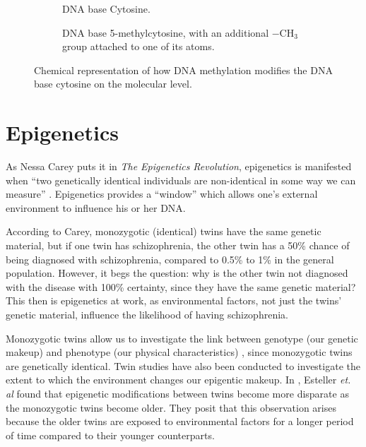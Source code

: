 \documentclass[12pt, twoside, a4paper]{report}
\begin{document}
\begin{figure}[t!]
\begin{subfigure}[t]{0.5\textwidth}
	\centering
	\caption{DNA base Cytosine.}
\end{subfigure}%
\begin{subfigure}[t]{0.5\textwidth}
	\centering
	\caption{DNA base 5-methylcytosine, with an additional $-$CH$_3$ group attached to one of its atoms.}
\end{subfigure}
\caption{Chemical representation of how DNA methylation modifies the DNA base cytosine on the molecular level.}
\label{bg:bio:methylation}
\end{figure}

\section{Epigenetics} \label{bg:epi}
As Nessa Carey puts it in \textit{The Epigenetics Revolution}, epigenetics is manifested when ``two genetically identical individuals are non-identical in some way we can measure'' \cite{RefWorks:248}. Epigenetics provides a ``window'' which allows one's external environment to influence his or her DNA.

According to Carey, monozygotic (identical) twins have the same genetic material, but if one twin has schizophrenia, the other twin has a 50\% chance of being diagnosed with schizophrenia, compared to 0.5\% to 1\% in the general population. However, it begs the question: why is the other twin not diagnosed with the disease with 100\% certainty, since they have the same genetic material? This then is epigenetics at work, as environmental factors, not just the twins' genetic material, influence the likelihood of having schizophrenia.

Monozygotic twins allow us to investigate the link between genotype (our genetic makeup) and phenotype (our physical characteristics) \cite{RefWorks:104, RefWorks:250}, since monozygotic twins are genetically identical. Twin studies have also been conducted to investigate the extent to which the environment changes our epigentic makeup. In \cite{RefWorks:251}, Esteller \textit{et. al} found that epigenetic modifications between twins become more disparate as the monozygotic twins become older. They posit that this observation arises because the older twins are exposed to environmental factors for a longer period of time compared to their younger counterparts.
\end{document}
